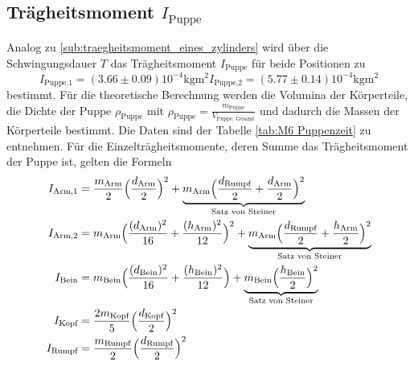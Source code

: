 \subsection{Trägheitsmoment $I_\text{Puppe}$}

\noindent Analog zu \ref{sub:traegheitsmoment_eines_zylinders} wird über die Schwingungsdauer $T$ das Trägheitsmoment $I_\text{Puppe}$ für beide Positionen zu
\begin{subequations}
	\begin{equation}
		\label{wert:Puppe1}
		I_\text{Puppe,1}=(3.66\pm0.09)10^{-4} \si{\kilo\gram\meter\squared}
	\end{equation}
	\begin{equation}
		\label{wert:Puppe2}
		I_\text{Puppe,2}=(5.77\pm0.14)10^{-4} \si{\kilo\gram\meter\squared}
	\end{equation}
\end{subequations}
bestimmt.
Für die theoretische Berechnung werden die Volumina der Körperteile, die Dichte der Puppe $\rho_\text{Puppe}$ 
mit $\rho_\text{Puppe}=\frac{m_\text{Puppe}}{V_\text{Puppe, Gesamt}}$ und dadurch die Massen der Körperteile bestimmt. 
Die Daten sind der Tabelle \ref{tab:M6 Puppenzeit} zu entnehmen.
Für die Einzelträgheitsmomente, deren Summe das Trägheitsmoment der Puppe ist, gelten die Formeln\cite{kuchen}
\begin{align*}
	I_\text{Arm,1} &= \frac{m_\text{Arm}}{2}\Bigl(\frac{d_\text{Arm}}{2}\Bigr)^2+\underbrace{m_\text{Arm}\Bigl(\frac{d_\text{Rumpf}}{2}+\frac{d_\text{Arm}}{2}\Bigr)^2}_{\text{Satz von Steiner}}\\
	I_\text{Arm,2} &= m_\text{Arm}\Bigl(\frac{(d_\text{Arm})^2}{16}+\frac{(h_\text{Arm})^2}{12}\Bigr)^2+\underbrace{m_\text{Arm}\Bigl(\frac{d_\text{Rumpf}}{2}+\frac{h_\text{Arm}}{2}\Bigr)^2}_{\text{Satz von Steiner}}\\
	I_\text{Bein} &= m_\text{Bein}\Bigl(\frac{(d_\text{Bein})^2}{16}+\frac{(h_\text{Bein})^2}{12}\Bigr)+
	\underbrace{m_\text{Bein}\Bigl(\frac{h_\text{Bein}}{2}\Bigr)^2}_{\text{Satz von Steiner}}\\
	I_\text{Kopf} &= \frac{2m_\text{Kopf}}{5}\Bigl(\frac{d_\text{Kopf}}{2}\Bigr)^2\\
	I_\text{Rumpf} &= \frac{m_\text{Rumpf}}{2}\Bigl(\frac{d_\text{Rumpf}}{2}\Bigr)^2
\end{align*}
\begin{landscape}
	\centering
	
	
\end{landscape}

